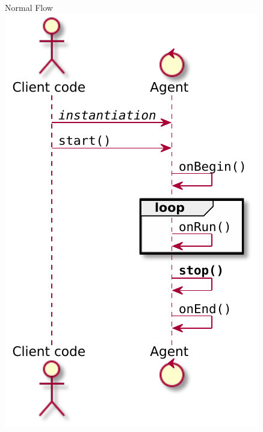 \documentclass[presentation]{beamer}\mode<presentation>{\usetheme{AMSCesenaPurpleAndGold}}
\begin{document}
\begin{frame}{Normal Flow}\centering
    \includegraphics[height=.8\textheight]{img/normal-flow.pdf}
\end{frame}
\end{document}
